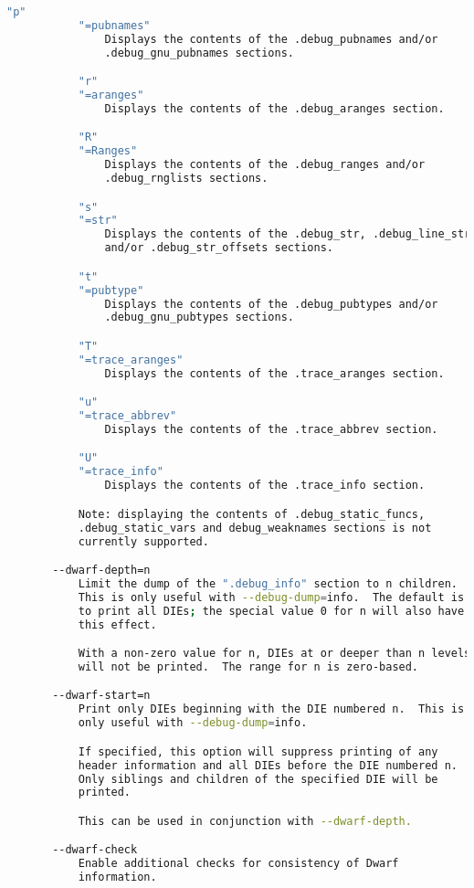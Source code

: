 {{\begin{lstlisting}[language=bash]
           "p"
           "=pubnames"
               Displays the contents of the .debug_pubnames and/or
               .debug_gnu_pubnames sections.

           "r"
           "=aranges"
               Displays the contents of the .debug_aranges section.

           "R"
           "=Ranges"
               Displays the contents of the .debug_ranges and/or
               .debug_rnglists sections.

           "s"
           "=str"
               Displays the contents of the .debug_str, .debug_line_str
               and/or .debug_str_offsets sections.

           "t"
           "=pubtype"
               Displays the contents of the .debug_pubtypes and/or
               .debug_gnu_pubtypes sections.

           "T"
           "=trace_aranges"
               Displays the contents of the .trace_aranges section.

           "u"
           "=trace_abbrev"
               Displays the contents of the .trace_abbrev section.

           "U"
           "=trace_info"
               Displays the contents of the .trace_info section.

           Note: displaying the contents of .debug_static_funcs,
           .debug_static_vars and debug_weaknames sections is not
           currently supported.

       --dwarf-depth=n
           Limit the dump of the ".debug_info" section to n children.
           This is only useful with --debug-dump=info.  The default is
           to print all DIEs; the special value 0 for n will also have
           this effect.

           With a non-zero value for n, DIEs at or deeper than n levels
           will not be printed.  The range for n is zero-based.

       --dwarf-start=n
           Print only DIEs beginning with the DIE numbered n.  This is
           only useful with --debug-dump=info.

           If specified, this option will suppress printing of any
           header information and all DIEs before the DIE numbered n.
           Only siblings and children of the specified DIE will be
           printed.

           This can be used in conjunction with --dwarf-depth.

       --dwarf-check
           Enable additional checks for consistency of Dwarf
           information.


\end{lstlisting}}}
